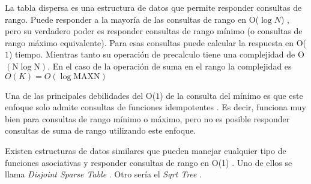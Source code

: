 La tabla dispersa es una estructura de datos que permite responder consultas de rango. Puede responder a la mayoría de las consultas de rango en
O($\log N$) , pero su verdadero poder es responder consultas de rango mínimo (o consultas de rango máximo equivalente). Para esas consultas puede
calcular la respuesta en O($1$) tiempo. Mientras tanto su operación de precalculo tiene una complejidad de O$(\text{N} \log \text{N})$. En el caso de la operación de suma en el rango la complejidad es $O(K) = O(\log \text{MAXN})$

Una de las principales debilidades del O($1$) de la consulta del mínimo es que este enfoque solo admite consultas de funciones idempotentes . Es decir, funciona muy bien para consultas de rango mínimo o máximo, pero no es posible responder consultas de suma de rango utilizando este enfoque.

Existen estructuras de datos similares que pueden manejar cualquier tipo de funciones asociativas y responder consultas de rango en O(1) . Uno de
ellos se llama \emph{Disjoint Sparse Table} . Otro sería el \emph{Sqrt Tree} .